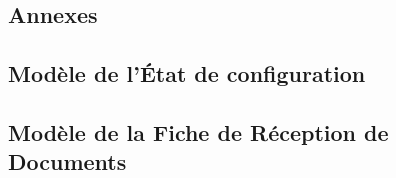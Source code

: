\documentclass[asi]{picINSA}
\begin{document}
 \begin{appendix}
	\part*{Annexes}
	\chapter{Modèle de l'État de configuration}
	
	\chapter{Modèle de la Fiche de Réception de Documents}
	
	\listoffigures
	 
	\listoftables
 \end{appendix}

\newpage

\pageQuatriemeCouverture{}
\end{document}
